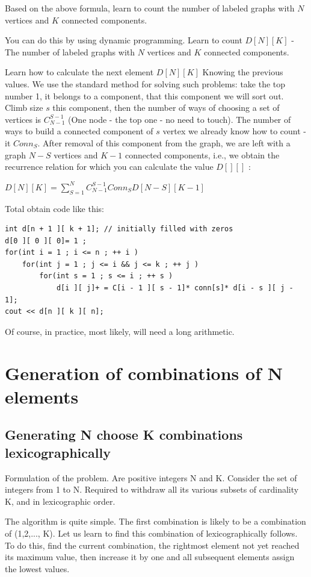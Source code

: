 Based on the above formula, learn to count the number of labeled graphs with $N$ vertices and $K$ connected components.

You can do this by using dynamic programming. Learn to count \textbf{$D [N][K]$} - The number of labeled graphs with $N$ vertices and $K$ connected components.

Learn how to calculate the next element $D [N][K]$ Knowing the previous values. We use the standard method for solving such problems: take the top number 1, it belongs to a component, that this component we will sort out. Climb size $s$ this component, then the number of ways of choosing a set of vertices is $C_ {N-1} ^ {S-1}$ (One node - the top one - no need to touch). The number of ways to build a connected component of $s$ vertex we already know how to count - it $Conn_S$. After removal of this component from the graph, we are left with a graph $N-S$ vertices and $K-1$ connected components, i.e., we obtain the recurrence relation for which you can calculate the value $D [][]$ :

$D[N][K]=\sum_{S=1}^{N}C_{N-1}^{S-1}Conn_{S}D[N-S][K-1]$

Total obtain code like this:
\begin{verbatim}
int d[n + 1 ][ k + 1]; // initially filled with zeros
d[0 ][ 0 ][ 0]= 1 ;
for(int i = 1 ; i <= n ; ++ i )
    for(int j = 1 ; j <= i && j <= k ; ++ j )
        for(int s = 1 ; s <= i ; ++ s )
            d[i ][ j]+ = C[i - 1 ][ s - 1]* conn[s]* d[i - s ][ j - 1];
cout << d[n ][ k ][ n]; 
\end{verbatim}
Of course, in practice, most likely, will need a long arithmetic.

\section{ Generation of combinations of N elements }

\subsection{ Generating N choose K combinations lexicographically }
Formulation of the problem. Are positive integers N and K. Consider the set of integers from 1 to N. Required to withdraw all its various subsets of cardinality K, and in lexicographic order.

The algorithm is quite simple. The first combination is likely to be a combination of (1,2,..., K). Let us learn to find this combination of lexicographically follows. To do this, find the current combination, the rightmost element not yet reached its maximum value, then increase it by one and all subsequent elements assign the lowest values.

